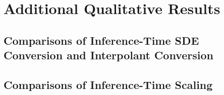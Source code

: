 \clearpage
\newpage

\section{Additional Qualitative Results}
\subsection{Comparisons of Inference-Time SDE Conversion and Interpolant Conversion}
\label{sec:appendix_quali_ode_sde_vp}


\clearpage
\newpage
\subsection{Comparisons of Inference-Time Scaling}
\label{sec:appendix_quali_search_alg}



\clearpage
\newpage